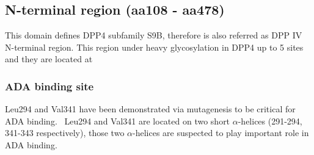 \subsection{N-terminal region (aa108 - aa478)}

This domain defines DPP4 subfamily S9B, therefore is also referred as DPP IV N-terminal region. This region under heavy glycosylation  in DPP4 up to 5 sites and they are located at  

\subsubsection{ADA binding site}
Leu294 and Val341 have been demonstrated via mutagenesis to be critical for ADA binding.~\cite{Abbott_1999} Leu294 and Val341 are located on two short $\alpha$-helices (291-294, 341-343 respectively), those two $\alpha$-helices are suspected to play important role in ADA binding. 
